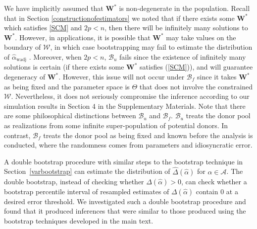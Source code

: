 \documentclass[11pt]{article}
\def\mbf#1{\mathbf{#1}} %
\def\mrm#1{\mathrm{#1}} %
\def\mc#1{\mathcal{#1}} %
\theoremstyle{definition}
\begin{document}
We have implicitly assumed that $\mathbf{W}^*$ is non-degenerate in the population.  Recall that in Section \ref{constructionofestimators} we noted that if there exists some $\mathbf{W}^*$ which satisfies \eqref{SCM} and $2p < n$, then there will be infinitely many solutions to $\mathbf{W}^*$. However, in applications, it is possible that $\mathbf{W}^*$ may take values on the boundary of $\mc{W}$, in which case bootstrapping may fail to estimate the distribution of $\hat{\alpha}_{\mrm{wadj}}$ \citep{andrews2000inconsistency}.  Moreover, when $2p < n$, $\mc{B}_u$ fails since the existence of infinitely many solutions is certain (if there exists some $\mathbf{W}^*$ satisfies (\ref{SCM})), and will guarantee degeneracy of  $\mathbf{W}^*$. However, this issue will not occur under $\mc{B}_f$ since it takes $\mbf{W}^*$ as being fixed and the parameter space is $\Theta$ that does not involve the constrained $\mc{W}$. Nevertheless, it does not seriously compromise the inference according to our simulation results in Section 4 in the Supplementary Materials. Note that there are some philosophical distinctions between $\mc{B}_u$  and $\mc{B}_f$. $\mc{B}_u$ treats the donor pool as realizations from some infinite super-population of potential donors. In contrast, $\mc{B}_f$ treats the donor pool as being fixed  and known before the analysis is conducted, where the randomness comes from parameters and idiosyncratic error.


A double bootstrap procedure with similar steps to the bootstrap technique in Section~\ref{varbootstrap} can estimate the distribution of $\hat\Delta(\hat{\alpha})$ for $\hat{\alpha} \in \mc{A}$. The double bootstrap, instead of checking whether $\Delta(\hat{\alpha})>0$, can check whether a bootstrap percentile interval of resampled estimates of $\Delta(\hat{\alpha})$ contain 0 at a desired error threshold. We investigated such a double bootstrap procedure and found that it produced inferences that were similar to those produced using the bootstrap techniques developed in the main text. 
\end{document}
